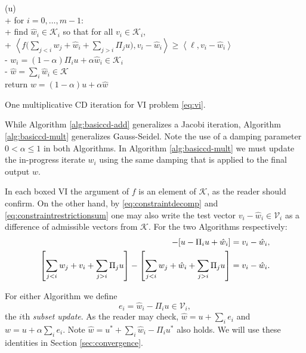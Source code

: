 \documentclass[letterpaper,final,12pt,reqno]{amsart}
\theoremstyle{cstyle}
\theoremstyle{cstyle*}
\theoremstyle{dstyle}
\numberwithin{equation}{section}
\numberwithin{figure}{section}
\numberwithin{table}{section}
\numberwithin{theorem}{section}
\newcommand{\cK}{\mathcal{K}}
\newcommand{\cV}{\mathcal{V}}
\newcommand{\ip}[2]{\left<#1,#2\right>}
\begin{document}
\begin{pseudofloat}[H]
\begin{pseudo*}
(u)\text{:} \\+
    for $i = 0,\dots,m-1$: \\+
        \rm{find} $\hat w_i\in \cK_i$ \rm{so that for all} $v_i\in \cK_i$, \\+
            $\displaystyle \boxed{\ip{f\Big(\sum_{j<i} w_j + \hat w_i + \sum_{j>i} \Pi_j u\Big)}{v_i-\hat w_i} \ge \ip{\ell}{v_i-\hat w_i}}$ \\-
            $w_i = (1-\alpha) \Pi_i u + \alpha \hat w_i\in\cK_i$ \\-
    $\hat w = \sum_i \hat w_i\in\cK$ \\
    return $w=(1-\alpha) u + \alpha \hat w$
\end{pseudo*}
\caption{One multiplicative CD iteration for VI problem \eqref{eq:vi}.}
\label{alg:basiccd-mult}
\end{pseudofloat}

While Algorithm \ref{alg:basiccd-add} generalizes a Jacobi iteration, Algorithm \ref{alg:basiccd-mult} generalizes Gauss-Seidel.  Note the use of a damping parameter $0<\alpha\le 1$ in both Algorithms.  In Algorithm \ref{alg:basiccd-mult} we must update the in-progress iterate $w_i$ using the same damping that is applied to the final output $w$.

In each boxed VI the argument of $f$ is an element of $\cK$, as the reader should confirm.  On the other hand, by \eqref{eq:constraintdecomp} and \eqref{eq:constraintrestrictionsum} one may also write the test vector $v_i - \hat w_i \in \cV_i$ as a difference of admissible vectors from $\cK$.  For the two Algorithms respectively:
\begin{align*}
[u - \Pi_i u + v_i] - [u - \Pi_i u + \hat w_i] &= v_i - \hat w_i, \label{eq:admissibledifference} \\
\left[\sum_{j<i} w_j + v_i + \sum_{j>i} \Pi_j u\right] - \left[\sum_{j<i} w_j + \hat w_i + \sum_{j>i} \Pi_j u\right] &= v_i - \hat w_i.  \notag
\end{align*}

For either Algorithm we define
\begin{equation}
e_i = \hat w_i - \Pi_i u \in \cV_i, \label{eq:ithupdate}
\end{equation}
the $i$th \emph{subset update}.  As the reader may check, $\hat w = u + \sum_{i} e_i$ and $w = u + \alpha \sum_i e_i$.  Note $\hat w = u^* + \sum_i \hat w_i - \Pi_i u^*$ also holds.  We will use these identities in Section \ref{sec:convergence}.
\end{document}
